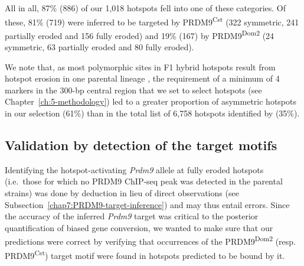 All in all, 87\% (886) of our 1,018 hotspots fell into one of these categories. 
Of these, 81\% (719) were inferred to be targeted by PRDM9\textsuperscript{Cst} (322 symmetric, 241 partially eroded and 156 fully eroded) and 19\% (167) by PRDM9\textsuperscript{Dom2} (24 symmetric, 63 partially eroded and 80 fully eroded).

We note that, as most polymorphic sites in F1 hybrid hotspots result from hotspot erosion in one parental lineage \citep{smagulova2016evolutionary}, the requirement of a minimum of 4 markers in the 300-bp central region that we set to select hotspots (see Chapter~\ref{ch:5-methodology}) led to a greater proportion of asymmetric hotspots in our selection (61\%) than in the total list of 6,758 hotspots identified by \citet{baker2015prdm9} (35\%).\\




\subsection{Validation by detection of the target motifs}

Identifying the hotspot-activating \textit{Prdm9} allele at fully eroded hotspots (i.e.\ those for which no PRDM9 ChIP-seq peak was detected in the parental strains) was done by deduction in lieu of direct observations (see Subsection~\ref{chap7:PRDM9-target-inference}) and may thus entail errors.
Since the accuracy of the inferred \textit{Prdm9} target was critical to the posterior quantification of biased gene conversion, we wanted to make sure that our predictions were correct by verifying that occurrences of the PRDM9\textsuperscript{Dom2} (resp. PRDM9\textsuperscript{Cst}) target motif were found in hotspots predicted to be bound by it.

